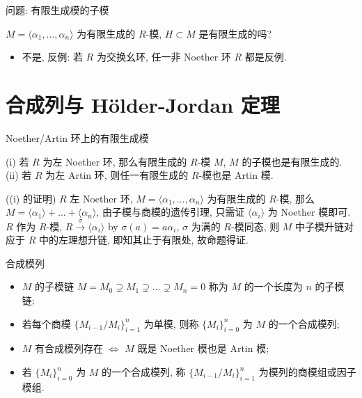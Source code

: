 
\begin{frame}{问题: 有限生成模的子模}

\begin{question}[有限生成模的子模]
$M = \langle \alpha_1, \dots, \alpha_n \rangle$ 为有限生成的 $R$-模,
$H \subset M$ 是有限生成的吗?
\end{question}

\begin{itemize}
\item 不是, 反例: 若 $R$ 为交换幺环, 任一非 Noether 环 $R$ 都是反例.
\end{itemize}

\end{frame}


\section[合成列]{合成列与 Hölder-Jordan 定理}


\begin{frame}{Noether/Artin 环上的有限生成模}

\begin{lem}
(i) 若 $R$ 为左 Noether 环, 那么有限生成的 $R$-模 $M$,
$M$ 的子模也是有限生成的.
(ii) 若 $R$ 为左 Artin 环, 则任一有限生成的 $R$-模也是 Artin 模.
\end{lem}

\startproof[bg=yellow, fg=red]((i) 的证明)
$R$ 左 Noether 环, $M = \langle \alpha_1, \dots, \alpha_n \rangle$
为有限生成的 $R$-模,
那么 $M = \langle \alpha_1 \rangle + \dots + \langle \alpha_n \rangle$,
由子模与商模的遗传引理, 只需证 $\langle \alpha_i \rangle$ 为 Noether 模即可.
$R$ 作为 $R$-模, $R \xrightarrow{\ \sigma\ } \langle \alpha_i \rangle$
by $\sigma(a) = a\alpha_i$, $\sigma$ 为满的 $R$-模同态,
则 $M$ 中子模升链对应于 $R$ 中的左理想升链, 即知其止于有限处,
故命题得证.

\end{frame}


\begin{frame}{合成模列}

\begin{itemize}
\item $M$ 的子模链 $M = M_0 \supsetneq M_1 \supsetneq \dots \supsetneq M_n = 0$
  称为 $M$ 的一个长度为 $n$ 的子模链;
\item 若每个商模 $\{ M_{i-1}/M_i \}_{i=1}^{n}$ 为单模,
  则称 $\{ M_i \}_{i=0}^{n}$ 为 $M$ 的一个\alert{合成模列};
\item $M$ 有合成模列存在 $\iff$ $M$ 既是 Noether 模也是 Artin 模;
\item 若 $\{ M_i \}_{i=0}^{n}$ 为 $M$ 的一个合成模列,
  称 $\{ M_{i-1}/M_i \}_{i=1}^{n}$ 为模列的商模组或因子模组.
\end{itemize}

\end{frame}

